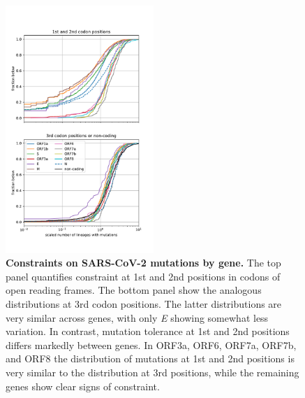 \begin{figure}[h]
    \includegraphics[width=0.5\textwidth]{figures/fitness_cost_by_gene.pdf}
    \caption{{\bf Constraints on SARS-CoV-2 mutations by gene.}
    The top panel quantifies constraint at 1st and 2nd positions in codons of open reading frames.
    The bottom panel show the analogous distributions at 3rd codon positions.
    The latter distributions are very similar across genes, with only \emph{E} showing somewhat less variation.
    In contrast, mutation tolerance at 1st and 2nd positions differs markedly between genes.
    In ORF3a, ORF6, ORF7a, ORF7b, and ORF8 the distribution of mutations at 1st and 2nd positions is very similar to the distribution at 3rd positions, while the remaining genes show clear signs of constraint.
    \label{fig:fitness_costs_supp}}
 \end{figure}

